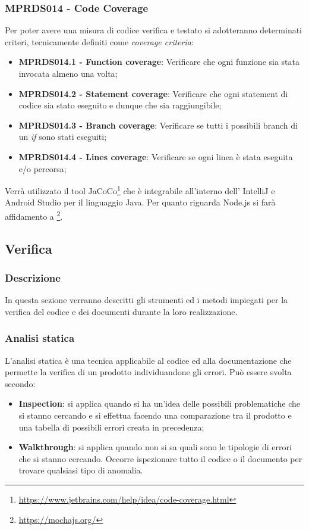\subsubsection{MPRDS014 - Code Coverage}
Per poter avere una misura di codice verifica e testato si adotteranno determinati criteri, tecnicamente definiti come \textit{coverage criteria}:
\begin{itemize}
    \item \textbf{MPRDS014.1 - Function coverage}: Verificare che ogni funzione sia stata invocata almeno una volta;
    \item \textbf{MPRDS014.2 - Statement coverage}: Verificare che ogni statement di codice sia stato eseguito e dunque che sia raggiungibile;
    \item \textbf{MPRDS014.3 - Branch coverage}: Verificare se tutti i possibili branch di un \textit{if} sono stati eseguiti;
    \item \textbf{MPRDS014.4 - Lines coverage}: Verificare se ogni linea è stata eseguita e/o percorsa;
\end{itemize}
Verrà utilizzato il tool JaCoCo\footnote{\href{https://www.jetbrains.com/help/idea/code-coverage.html}{https://www.jetbrains.com/help/idea/code-coverage.html}} che è integrabile all'interno dell' IntelliJ  e Android Studio per il linguaggio Java. Per quanto riguarda Node.js si farà affidamento a \footnote{\href{https://mochajs.org/}{https://mochajs.org/}}.

\subsection{Verifica}
\label{sec:verifica}
\subsubsection{Descrizione}
In questa sezione verranno descritti gli strumenti ed i metodi impiegati per la verifica del codice e dei documenti durante la loro realizzazione.
\subsubsection{Analisi statica}
L’analisi statica è una tecnica applicabile al codice ed alla documentazione che permette la verifica di un prodotto individuandone gli errori. Può essere svolta secondo:
\begin{itemize}
    \item \textbf{Inspection}: si applica quando si ha un’idea delle possibili problematiche che si stanno cercando e si effettua facendo una comparazione tra il prodotto e una tabella di possibili errori creata in precedenza;
    \item \textbf{Walkthrough}: si applica quando non si sa quali sono le tipologie di errori che si stanno cercando. Occorre ispezionare tutto il codice o il documento per trovare qualsiasi tipo di anomalia.
\end{itemize}
